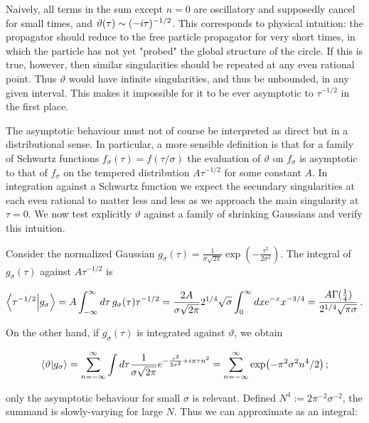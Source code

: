 \documentclass{article}
\newcommand{\T}{\ensuremath{\vartheta}}
\newcommand{\intR}{\int_{-\infty}^\infty}
\newcommand{\sumZ}{\sum_{n=-\infty}^{\infty}}
\begin{document}
Naively, all terms in the sum except $n=0$ are oscillatory and supposedly cancel for small times, and $\vartheta(\tau) \sim (-i\tau)^{-1/2}$. This corresponds to physical intuition: the propagator should reduce to the free particle propagator for very short times, in which the particle has not yet "probed" the global structure of the circle. If this is true, however, then similar singularities should be repeated at any even rational point. Thus $\T$ would have infinite singularities, and thus be unbounded, in any given interval. This makes it impossible for it to be ever asymptotic to $\tau^{-1/2}$ in the first place.

The asymptotic behaviour must not of course be interpreted as direct but in a distributional sense. In particular, a more sensible definition is that for a family of Schwartz functions $f_\sigma(\tau) = f(\tau/\sigma)$ the evaluation of $\vartheta$ on $f_\sigma$ is asymptotic to that of $f_\sigma$ on the tempered distribution $A \tau^{-1/2}$ for some constant $A$. In integration against a Schwartz function we expect the secundary singularities at each even rational to matter less and less as we approach the main singularity at $\tau = 0$. We now test explicitly $\vartheta$ against a family of shrinking Gaussians and verify this intuition.

Consider the normalized Gaussian $g_\sigma(\tau) = \frac{1}{\sigma \sqrt{2\pi}} \exp(-\frac{\tau^2}{2\sigma^2})$. The integral of $g_\sigma(\tau)$ against $A \tau^{-1/2}$ is

\begin{equation}
    \bra{\tau^{-1/2}}\ket{g_\sigma} =  A \intR d\tau \, g_\sigma(\tau) \tau^{-1/2} = \frac{2A}{\sigma\sqrt{2\pi}} 2^{1/4} \sqrt\sigma \int_0^\infty dx e^{-x} x^{-3/4} = \frac{A\Gamma(\frac{1}{4})}{2^{1/4}\sqrt{\pi\sigma}}\,.
\end{equation}

On the other hand, if $g_\sigma(\tau)$ is integrated against $\vartheta$, we obtain

\begin{equation}
    \bra{\vartheta}\ket{g_\sigma} = \sumZ \int d\tau \frac{1}{\sigma \sqrt{2\pi}} e^{-\frac{\tau^2}{2\sigma^2} + i\pi\tau n^2}  = \sumZ \exp(-\pi^2 \sigma^2 n^4 / 2)\,; 
\end{equation}

only the asymptotic behaviour for small $\sigma$ is relevant. Defined $N^4 := 2 \pi^{-2} \sigma^{-2}$, the summand is slowly-varying for large $N$. Thus we can approximate as an integral:
\end{document}
